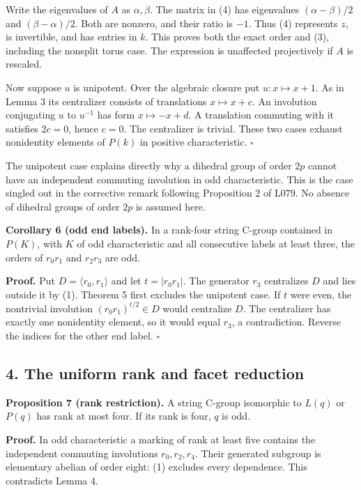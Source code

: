 \documentclass[
  11pt,
  a4paper,
]{article}
\begin{document}
Write the eigenvalues of \(A\) as \(\alpha,\beta\). The matrix in (4)
has eigenvalues \((\alpha-\beta)/2\) and \((\beta-\alpha)/2\). Both are
nonzero, and their ratio is \(-1\). Thus (4) represents \(z\), is
invertible, and has entries in \(k\). This proves both the exact order
and (3), including the nonsplit torus case. The expression is unaffected
projectively if \(A\) is rescaled.

Now suppose \(u\) is unipotent. Over the algebraic closure put
\(u:x\mapsto x+1\). As in Lemma 3 its centralizer consists of
translations \(x\mapsto x+c\). An involution conjugating \(u\) to
\(u^{-1}\) has form \(x\mapsto-x+d\). A translation commuting with it
satisfies \(2c=0\), hence \(c=0\). The centralizer is trivial. These two
cases exhaust nonidentity elements of \(P(k)\) in positive
characteristic. \(\square\)

The unipotent case explains directly why a dihedral group of order
\(2p\) cannot have an independent commuting involution in odd
characteristic. This is the case singled out in the corrective remark
following Proposition 2 of L079. No absence of dihedral groups of order
\(2p\) is assumed here.

\textbf{Corollary 6 (odd end labels).} In a rank-four string C-group
contained in \(P(K)\), with \(K\) of odd characteristic and all
consecutive labels at least three, the orders of \(r_0r_1\) and
\(r_2r_3\) are odd.

\textbf{Proof.} Put \(D=\langle r_0,r_1\rangle\) and let \(t=|r_0r_1|\).
The generator \(r_3\) centralizes \(D\) and lies outside it by (1).
Theorem 5 first excludes the unipotent case. If \(t\) were even, the
nontrivial involution \((r_0r_1)^{t/2}\in D\) would centralize \(D\).
The centralizer has exactly one nonidentity element, so it would equal
\(r_3\), a contradiction. Reverse the indices for the other end label.
\(\square\)

\subsection{4. The uniform rank and facet
reduction}\label{the-uniform-rank-and-facet-reduction}

\textbf{Proposition 7 (rank restriction).} A string C-group isomorphic
to \(L(q)\) or \(P(q)\) has rank at most four. If its rank is four,
\(q\) is odd.

\textbf{Proof.} In odd characteristic a marking of rank at least five
contains the independent commuting involutions \(r_0,r_2,r_4\). Their
generated subgroup is elementary abelian of order eight: (1) excludes
every dependence. This contradicts Lemma 4.
\end{document}
